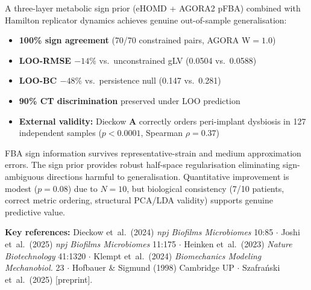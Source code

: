 \documentclass[10pt,a4paper]{article}
\newcommand{\bA}{\mathbf{A}}
\begin{document}
\begin{keybox}[Summary]
A three-layer metabolic sign prior (eHOMD + AGORA2 pFBA) combined with
Hamilton replicator dynamics achieves genuine out-of-sample generalisation:
\begin{itemize}[noitemsep]
  \item \textbf{100\% sign agreement} (70/70 constrained pairs, AGORA W$=1.0$)
  \item \textbf{LOO-RMSE $-14\%$} vs.\ unconstrained gLV (0.0504 vs.\ 0.0588)
  \item \textbf{LOO-BC $-48\%$} vs.\ persistence null (0.147 vs.\ 0.281)
  \item \textbf{90\% CT discrimination} preserved under LOO prediction
  \item \textbf{External validity:} Dieckow $\bA$ correctly orders peri-implant dysbiosis
        in 127 independent samples ($p<0.0001$, Spearman $\rho=0.37$)
\end{itemize}
FBA sign information survives representative-strain and medium approximation errors.
The sign prior provides robust half-space regularisation eliminating sign-ambiguous
directions harmful to generalisation.
Quantitative improvement is modest ($p=0.08$) due to $N=10$, but biological
consistency (7/10 patients, correct metric ordering, structural PCA/LDA validity)
supports genuine predictive value.
\end{keybox}

\bigskip
\noindent\small\textbf{Key references:}
Dieckow et~al.\ (2024) \textit{npj Biofilms Microbiomes} 10:85 $\cdot$
Joshi et~al.\ (2025) \textit{npj Biofilms Microbiomes} 11:175 $\cdot$
Heinken et~al.\ (2023) \textit{Nature Biotechnology} 41:1320 $\cdot$
Klempt et~al.\ (2024) \textit{Biomechanics Modeling Mechanobiol.} 23 $\cdot$
Hofbauer \& Sigmund (1998) Cambridge UP $\cdot$
Szafra\'{n}ski et~al.\ (2025) [preprint].
\end{document}
